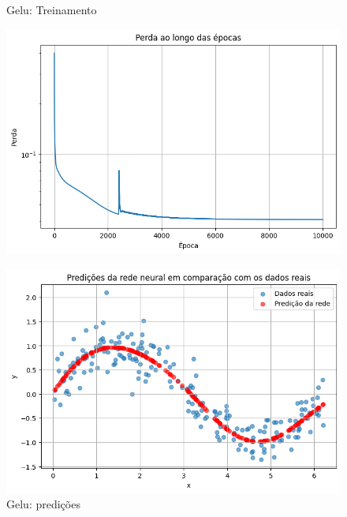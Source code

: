 \begin{figure}[htb]
	\label{teste}
	\centering
	\begin{minipage}{0.45\textwidth}
	\centering
	\caption{Gelu: Treinamento} \label{tarefa01:gelu:treinamento}
	\includegraphics[width=\textwidth]{./0803_imgs/png-241111-212601400-7995113924505873963.png}
	\end{minipage}
	\hfill
	\begin{minipage}{0.45\textwidth}
	\centering
	\caption{Gelu: predições} \label{tarefa01:gelu:predicoes}
	\includegraphics[width=\textwidth]{./0803_imgs/png-241111-212606975-12044568718402292765.png}
	\end{minipage}
\end{figure}
